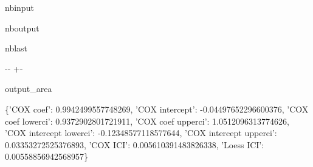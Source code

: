 \documentclass[letterpaper,10pt,english]{sphinxmanual}
\begin{document}
\begin{sphinxuseclass}{nbinput}
{
\begin{sphinxVerbatim}[commandchars=\\\{\}]
\llap{\color{nbsphinxin}[2]:\,\hspace{\fboxrule}\hspace{\fboxsep}}   
  
  \PYG{p}{[}\PYG{p}{]}
\end{sphinxVerbatim}
}

\end{sphinxuseclass}
\begin{sphinxuseclass}{nboutput}
\begin{sphinxuseclass}{nblast}
{

\kern-\sphinxverbatimsmallskipamount\kern-\baselineskip
\kern+\FrameHeightAdjust\kern-\fboxrule
\vspace{\nbsphinxcodecellspacing}

\begin{sphinxuseclass}{output_area}
\begin{sphinxuseclass}{}


\begin{sphinxVerbatim}[commandchars=\\\{\}]
\llap{\color{nbsphinxout}[2]:\,\hspace{\fboxrule}\hspace{\fboxsep}}\{'COX coef': 0.9942499557748269,
 'COX intercept': -0.04497652296600376,
 'COX coef lowerci': 0.9372902801721911,
 'COX coef upperci': 1.0512096313774626,
 'COX intercept lowerci': -0.12348577118577644,
 'COX intercept upperci': 0.03353272525376893,
 'COX ICI': 0.005610391483826338,
 'Loess ICI': 0.00558856942568957\}
\end{sphinxVerbatim}



\end{sphinxuseclass}
\end{sphinxuseclass}
}

\end{sphinxuseclass}
\end{sphinxuseclass}
\end{document}
